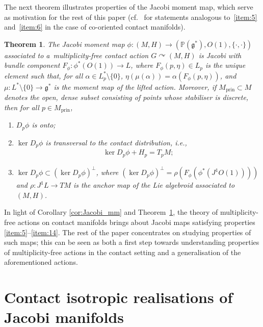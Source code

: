 \documentclass[pdftex]{sigma}
\numberwithin{equation}{section}
\newtheorem{Theorem}{Theorem}[section]
\newcommand{\CM}{(M,H)} %
\newcommand{\pg}{\mathbb{P}(\mathfrak{g}^*)} %
\begin{document}
The next theorem illustrates properties of the Jacobi moment map, which serve as motivation for the rest of this paper (cf.\ \cite[Proposition~3.4, Lemma~3.5 and Proposition~5.1]{Zambon} for statements analogous to~\ref{item:5} and~\ref{item:6} in the case of co-oriented contact
manifolds).

\begin{Theorem}\label{lemma:properties_Jac_mm}
The Jacobi moment map $\phi \colon \CM \to (\pg,O(1),\{\cdot,\cdot\} )$ associated to a~mul\-ti\-plicity-free contact action $ G \curvearrowright \CM$ is Jacobi with bundle component $F_{\phi} \colon \phi^*(O(1)) \to L$, where $F_{\phi}(p,\eta) \in L_p$ is the unique element such that, for all $\alpha \in L^*_p \setminus \{0\}$, $\eta(\mu(\alpha)) = \alpha ( F_{\phi}(p,\eta) )$, and $\mu \colon L^* \setminus \{0\} \to \mathfrak{g}^*$ is the moment map of the lifted action. Moreover, if $M_{\mathrm{prin}} \subset M$ denotes the open, dense subset consisting of points whose stabiliser is
 discrete, then for all $p \in M_{\mathrm{prin}}$,
 \begin{enumerate}[label={\rm (J\arabic*)}, ref={\rm (J\arabic*)}]\itemsep=0pt
 \item\label{item:5} $D_p\phi$ is onto;
 \item \label{item:6} $\ker D_p \phi$ is transversal to the contact distribution, i.e.,
 \begin{gather*}
 \ker D_p \phi + H_p = T_p M;
 \end{gather*}
 \item \label{item:14} $\ker D_p \phi \subset (\ker D_p \phi )^{\perp}$, where $ ( \ker D_p \phi )^{\perp} = \rho (F_{\phi} (\phi^* (J^1O(1) ) ) )$ and $\rho \colon J^1L \to TM$ is the anchor map of the Lie algebroid associated to~$\CM$.
 \end{enumerate}
\end{Theorem}

In light of Corollary \ref{cor:Jacobi_mm} and Theorem~\ref{lemma:properties_Jac_mm}, the theory of multiplicity-free actions on contact manifolds brings about Jacobi maps satisfying properties \ref{item:5}--\ref{item:14}. The rest of the paper concentrates on studying properties of such maps; this can be seen as both a f\/irst step towards understanding properties of multiplicity-free actions in the contact setting and a generalisation
of the aforementioned actions.

\section{Contact isotropic realisations of Jacobi manifolds}\label{sec:cont-isotr-real}
\end{document}
